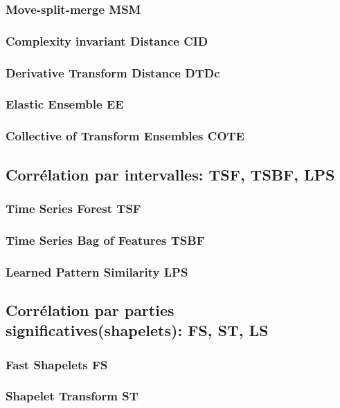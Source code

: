 			\subsubsection{Move-split-merge MSM}
			\subsubsection{Complexity invariant Distance CID}
			\subsubsection{Derivative Transform Distance DTDc}
			\subsubsection{Elastic Ensemble EE}
			\subsubsection{Collective of Transform Ensembles COTE}
			\subsubsection{}
		\subsection{Corr\'elation par intervalles: TSF, TSBF, LPS}
			\subsubsection{Time Series Forest TSF}
			\subsubsection{Time Series Bag of Features TSBF}
			\subsubsection{Learned Pattern Similarity LPS}
		\subsection{Corr\'elation par parties significatives(shapelets): FS, ST, LS}
			\subsubsection{Fast Shapelets FS}
			\subsubsection{Shapelet Transform ST}
